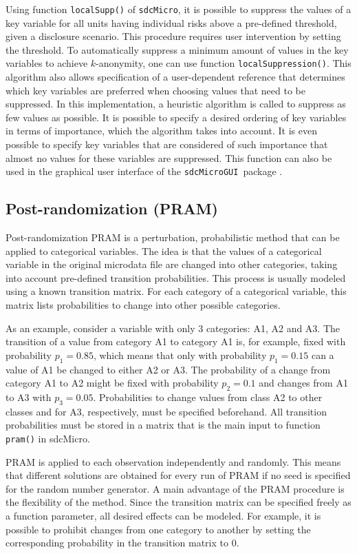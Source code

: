 \documentclass[12pt]{scrartcl}\usepackage[]{graphicx}\usepackage[]{color}
\newcommand{\sdcMicro}{\texttt{sdcMicro}}
\newcommand{\sdcMicroGUI}{\texttt{sdcMicroGUI}}
\begin{document}
Using function \lstinline{localSupp()} of \sdcMicro , it is possible to suppress the values of a key variable for all units having individual risks above a pre-defined threshold, given a disclosure scenario. This procedure requires user intervention by setting the threshold. To automatically suppress a minimum amount of values in the key variables to achieve $k$-anonymity, one can use function \lstinline{localSuppression()}. This algorithm also allows specification of a user-dependent reference that determines which key variables are preferred when choosing values that need to be suppressed. In this implementation, a heuristic algorithm is called to suppress as few values as possible. It is possible to specify a desired ordering of key variables in terms of importance, which the algorithm takes into account. It is even possible to specify key variables that are considered of such importance that almost no values for these variables are suppressed. This function can also be used in the graphical user interface of the \sdcMicroGUI \ package \citep{sdcMicroGUI,guitutorial}.

\subsection{Post-randomization (PRAM)}\label{method:pram}
Post-randomization \citep{Gouweleeuw98} PRAM is a perturbation, probabilistic method that can be applied to categorical variables. The idea is that the values of a categorical variable in the original microdata file are changed into other categories, taking into account pre-defined transition probabilities. This process is usually modeled using a known transition matrix. For each category of a categorical variable, this matrix lists probabilities to change into other possible categories.

As an example, consider a variable with only 3 categories: A1, A2 and A3. The transition of a value from category A1 to category A1 is, for example, fixed with probability $p_1 = 0.85$, which means that only with probability $p_1 = 0.15$ can a value of A1 be changed to either A2 or A3. The probability of a change from category A1 to A2 might be fixed with probability $p_2 = 0.1$ and changes from A1 to A3 with $p_3 = 0.05$. Probabilities to change values from class A2 to other classes and for A3, respectively, must be specified beforehand. All transition probabilities must be stored in a matrix that is the main input to function \lstinline{pram()} in sdcMicro.

PRAM is applied to each observation independently and randomly. This means that different solutions are obtained for every run of PRAM if no seed is specified for the random number generator. A main advantage of the PRAM procedure is the flexibility of the method. Since the transition matrix can be specified freely as a function parameter, all desired effects can be modeled. For example, it is possible to prohibit changes from one category to another by setting the corresponding probability in the transition matrix to $0$.
\end{document}
